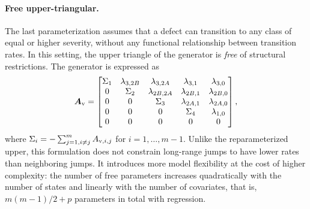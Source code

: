 \documentclass{article}
\newcommand{\myparagraph}[1]{\paragraph{#1}\mbox{}\\}
\newcommand{\RN}[1]{\textup{\uppercase\expandafter{\romannumeral#1}}}
\providecommand{\DIFadd}[1]{{\protect\color{blue} \sf #1}} %
\providecommand{\DIFaddbegin}{} %
\providecommand{\DIFaddend}{} %
\providecommand{\DIFdelbegin}{} %
\providecommand{\DIFdelend}{} %
\begin{document}
\DIFdelbegin %
\DIFdelend \DIFaddbegin \paragraph{\DIFadd{Free upper-triangular.}}
\DIFaddend The last parameterization assumes that a defect can transition to any class of equal or higher severity, without any functional relationship between transition rates. In this setting, the upper triangle of the generator is \textit{free} of structural restrictions. The generator is expressed as
\begin{align}
    \bm{A}_{\RN{5}} =
    \begin{bmatrix} 
    \Sigma_1 & \lambda_{3,2B} & \lambda_{3, 2A} & \lambda_{3, 1} & \lambda_{3, 0} \\
    0 & \Sigma_2 & \lambda_{2B, 2A} & \lambda_{2B, 1} & \lambda_{2B, 0} \\
    0 & 0 & \Sigma_3 & \lambda_{2A, 1} & \lambda_{2A, 0} \\
    0 & 0 & 0 & \Sigma_4 & \lambda_{1, 0} \\
    0 & 0 & 0 & 0 & 0 \\
    \end{bmatrix}, \label{eq:generator_free_upper}
\end{align}
where $\Sigma_i = -\sum_{j=1, i \neq j}^m A_{\RN{5},i,j}$ for $i = 1, \dots, m-1$.
Unlike the reparameterized upper, this formulation does not constrain long-range jumps to have lower rates than neighboring jumps. It introduces more model flexibility at the cost of higher complexity: the number of free parameters increases quadratically with the number of states and linearly with the number of covariates, that is, $m(m-1)/2+p$ parameters in total with regression.


\DIFdelbegin %
\end{document}

